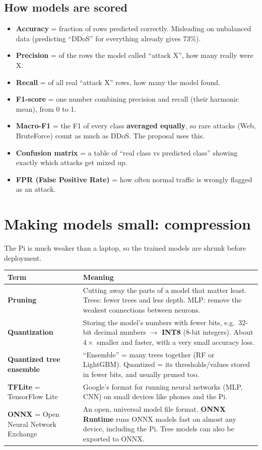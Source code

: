 \documentclass[11pt]{article}
\begin{document}
\subsection*{How models are scored}
\begin{itemize}
\item \textbf{Accuracy} = fraction of rows predicted correctly. Misleading on unbalanced data (predicting ``DDoS'' for everything already gives 73\%).
\item \textbf{Precision} = of the rows the model called ``attack X'', how many really were X.
\item \textbf{Recall} = of all real ``attack X'' rows, how many the model found.
\item \textbf{F1-score} = one number combining precision and recall (their harmonic mean), from 0 to 1.
\item \textbf{Macro-F1} = the F1 of every class \textbf{averaged equally}, so rare attacks (Web, BruteForce) count as much as DDoS. The proposal uses this.
\item \textbf{Confusion matrix} = a table of ``real class vs predicted class'' showing exactly which attacks get mixed up.
\item \textbf{FPR (False Positive Rate)} = how often normal traffic is wrongly flagged as an attack.
\end{itemize}

\newpage
\section{Making models small: compression}

The Pi is much weaker than a laptop, so the trained models are shrunk before deployment.

\begin{longtable}{@{}>{\raggedright}p{4.2cm} >{\raggedright\arraybackslash}p{11.8cm}@{}}
\toprule
\textbf{Term} & \textbf{Meaning} \\
\midrule
\endhead
\textbf{Pruning} & Cutting away the parts of a model that matter least.
Trees: fewer trees and less depth. MLP: remove the weakest connections between neurons. \\
\textbf{Quantization} & Storing the model's numbers with fewer bits, e.g.\ 32-bit decimal numbers $\rightarrow$ \textbf{INT8} (8-bit integers).
About $4\times$ smaller and faster, with a very small accuracy loss. \\
\textbf{Quantized tree ensemble} & ``Ensemble'' = many trees together (RF or LightGBM). Quantized = its thresholds/values stored in fewer bits, and usually pruned too. \\
\textbf{TFLite} = TensorFlow Lite & Google's format for running neural networks (MLP, CNN) on small devices like phones and the Pi. \\
\textbf{ONNX} = Open Neural Network Exchange & An open, universal model file format. \textbf{ONNX Runtime} runs ONNX models fast on almost any device, including the Pi. Tree models can also be exported to ONNX. \\
\bottomrule
\end{longtable}
\end{document}
